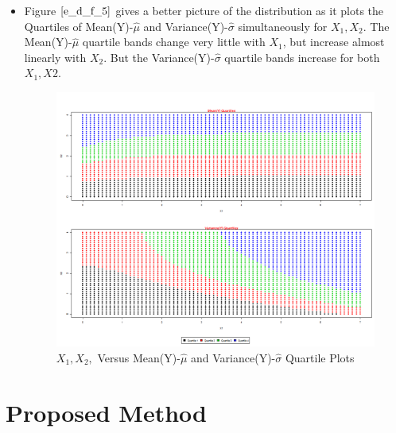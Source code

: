 \documentclass[twoside,12pt]{article}
\begin{document}
\begin{itemize}
\FloatBarrier
\item
Figure $\eqref{e_d_f_5}$ gives a better picture of the distribution as it plots the Quartiles of Mean(Y)-$\hat{\mu}$ and Variance(Y)-$\hat{\sigma}$ simultaneously for $X_1,X_2$. The  Mean(Y)-$\hat{\mu}$ quartile bands change very little with $X_1$, but increase almost linearly with $X_2$. But the Variance(Y)-$\hat{\sigma}$ quartile bands increase for both $X_1,X2$.
\FloatBarrier
\begin{figure}[!htbp]
\centering
\includegraphics[scale=.50]{images/mt_matplot_x1_x2_mu_v_qt.png} 
\caption{$X_1, X_2,$ Versus  Mean(Y)-$\hat{\mu}$ and Variance(Y)-$\hat{\sigma}$ Quartile Plots}
\label{e_d_f_5}
\end{figure}

\end{itemize}








\section{Proposed Method}
\label{Proposed Method}
\end{document}
